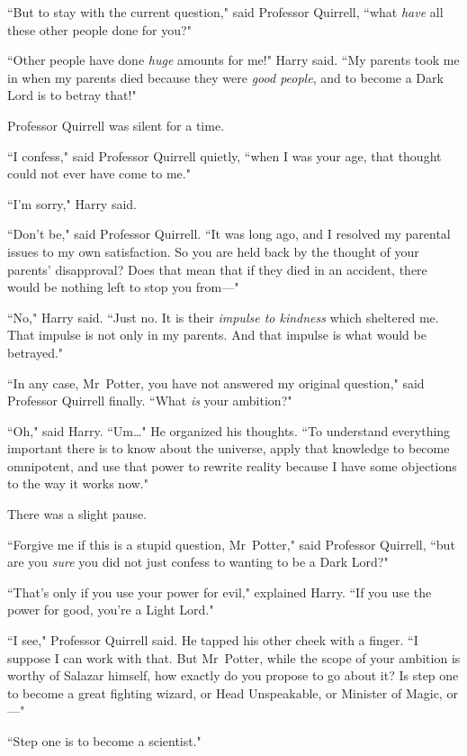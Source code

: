 ``But to stay with the current question," said Professor Quirrell, ``what \emph{have} all these other people done for you?"

``Other people have done \emph{huge} amounts for me!" Harry said. ``My parents took me in when my parents died because they were \emph{good people}, and to become a Dark Lord is to betray that!"

Professor Quirrell was silent for a time.

``I confess," said Professor Quirrell quietly, ``when I was your age, that thought could not ever have come to me."

``I'm sorry," Harry said.

``Don't be," said Professor Quirrell. ``It was long ago, and I resolved my parental issues to my own satisfaction. So you are held back by the thought of your parents' disapproval? Does that mean that if they died in an accident, there would be nothing left to stop you from—"

``No," Harry said. ``Just no. It is their \emph{impulse to kindness} which sheltered me. That impulse is not only in my parents. And that impulse is what would be betrayed."

``In any case, Mr~Potter, you have not answered my original question," said Professor Quirrell finally. ``What \emph{is} your ambition?"

``Oh," said Harry. ``Um…" He organized his thoughts. ``To understand everything important there is to know about the universe, apply that knowledge to become omnipotent, and use that power to rewrite reality because I have some objections to the way it works now."

There was a slight pause.

``Forgive me if this is a stupid question, Mr~Potter," said Professor Quirrell, ``but are you \emph{sure} you did not just confess to wanting to be a Dark Lord?"

``That's only if you use your power for evil," explained Harry. ``If you use the power for good, you're a Light Lord."

``I see," Professor Quirrell said. He tapped his other cheek with a finger. ``I suppose I can work with that. But Mr~Potter, while the scope of your ambition is worthy of Salazar himself, how exactly do you propose to go about it? Is step one to become a great fighting wizard, or Head Unspeakable, or Minister of Magic, or—"

``Step one is to become a scientist."

